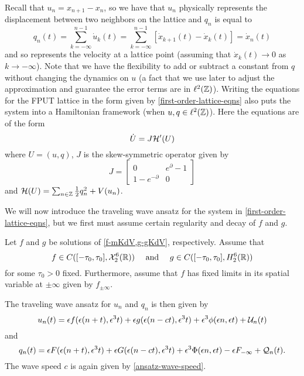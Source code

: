Recall that \(u_{n} = x_{n+1} - x_n\), so we have that \(u_n\) physically represents the displacement between two neighbors on the lattice and \(q_n\) is equal to 
\begin{equation}
	q_n(t) = \sum_{k=-\infty}^{n-1} \dot u_k(t) = \sum_{k=-\infty}^{n-1} [\dot x_{k+1}(t) - \dot x_k(t)] = \dot x_n(t)
\end{equation}
and so represents the velocity at a lattice point (assuming that \(\dot x_k(t) \to 0\) as \(k\to-\infty\)). Note that we have the flexibility to add or subtract a constant from \(q\) without changing the dynamics on \(u\) (a fact that we use later to adjust the approximation and guarantee the error terms are in \(\ell^2(\mathbb{Z})\)). Writing the equations for the FPUT lattice in the form given by \cref{first-order-lattice-eqns} also puts the system into a Hamiltonian framework (when \(u, q\in\ell^2(\mathbb{Z})\)). Here the equations are of the form
\begin{equation}
	\dot U = J \mathcal{H}'(U)
\end{equation}
where \(U = (u,q)\), \(J\) is the skew-symmetric operator given by
\begin{equation}
	J = \begin{bmatrix}
		0 & e^\partial - 1 \\ 1 - e^{-\partial} & 0
	\end{bmatrix}
\end{equation}
and \(\mathcal{H}(U) = \sum_{n\in\mathbb{Z}} \frac 1 2 q_n^2 + V(u_n)\).

We will now introduce the traveling wave ansatz for the system in \cref{first-order-lattice-eqns}, but we first must assume certain regularity and decay of \(f\) and \(g\).
\begin{assum}\label{assumption-1}
	Let \(f\) and \(g\) be solutions of \cref{f-mKdV,g-gKdV}, respectively. Assume that \[f\in C([-\tau_0, \tau_0], \mathcal{X}_2^6(\mathbb{R})) \quad \text{ and } \quad g\in C([-\tau_0,\tau_0],H_2^6(\mathbb{R}))\] for some \(\tau_0>0\) fixed. Furthermore, assume that \(f\) has fixed limits in its spatial variable at \(\pm \infty\) given by \(f_{\pm \infty}\).
\end{assum}

The traveling wave ansatz for \(u_n\) and \(q_n\) is then given by
\begin{equation}\label{u-ansatz}
	u_n(t) = \epsilon f(\epsilon(n+t), \epsilon^3t) + \epsilon g(\epsilon(n-ct), \epsilon^3 t) + \epsilon^3 \phi(\epsilon n , \epsilon t) + \mathcal{U}_n(t)
\end{equation}
and 
\begin{equation}\label{q-ansatz}
	q_n(t) = \epsilon F(\epsilon(n+t), \epsilon^3 t) + \epsilon G(\epsilon(n-ct), \epsilon^3 t) + \epsilon^3 \Phi(\epsilon n, \epsilon t) - \epsilon F_{-\infty} + \mathcal{Q}_n(t).
\end{equation}
The wave speed \(c\) is again given by \cref{ansatz-wave-speed}. 

